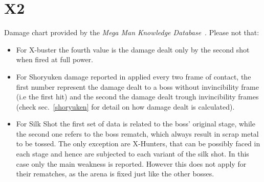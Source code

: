 \section{X2}
Damage chart provided by the \emph{Mega Man Knowledge Database}~\cite{wiki:damage_chart_X2}. 
Please not that:
\begin{itemize}
\item For X-buster the fourth value is the damage dealt only by the second shot when fired at full power.
\item For Shoryuken damage reported in applied every two frame of contact, the first number represent the damage dealt to a boss without invincibility frame (i.e the first hit) and the second the damage dealt trough invincibility frames (check sec.~\ref{shoryuken} for detail on how damage dealt is calculated).

\item For Silk Shot the first set of data is related to the boss' original stage, while the second one refers to the boss rematch, which always result in scrap metal to be tossed. The only exception are X-Hunters, that can be possibly faced in each stage and hence are subjected to each variant of the silk shot. In this case only the main weakness is reported. However this does not apply for their rematches, as the arena is fixed just like the other bosses.%
\end{itemize}

